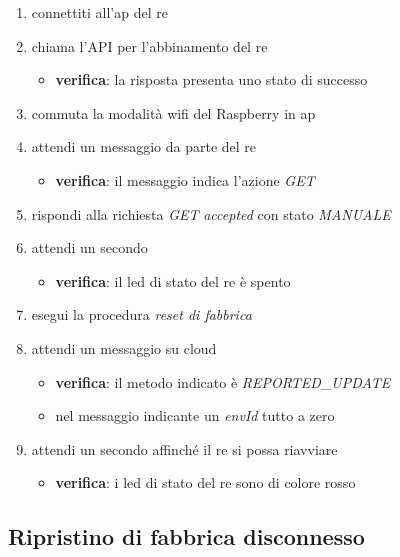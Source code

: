 \documentclass[12pt,a4paper,twoside,titlepage]{book}
\begin{document}
\begin{enumerate}
    \item connettiti all'\acrshort{ap} del \acrshort{re}
    \item chiama l'API per l'abbinamento del \acrshort{re} 
    \begin{itemize}
        \item \textbf{verifica}: la risposta presenta uno stato di successo 
    \end{itemize}
    \item commuta la modalità \Gls{wifi} del Raspberry in \acrshort{ap}
    \item attendi un messaggio da parte del \acrshort{re}
    \begin{itemize}
        \item \textbf{verifica}: il messaggio indica l'azione \textit{GET}
    \end{itemize}
    \item rispondi alla richiesta \textit{GET} \textit{accepted} con stato \textit{MANUALE}
    \item attendi un secondo 
    \begin{itemize}
        \item \textbf{verifica}: il \acrshort{led} di stato del \acrshort{re} è spento 
    \end{itemize}
    \item esegui la procedura \textit{reset di fabbrica}
    \item attendi un messaggio su cloud
    \begin{itemize}
        \item \textbf{verifica}: il metodo indicato è \textit{REPORTED\_UPDATE}
        \item nel messaggio indicante un \textit{envId} tutto a zero
    \end{itemize}
    \item attendi un secondo affinché il \acrshort{re} si possa riavviare
    \begin{itemize}
        \item \textbf{verifica}: i  \acrshort{led} di stato del \acrshort{re} sono di colore rosso
    \end{itemize}
\end{enumerate}

\subsection{Ripristino di fabbrica disconnesso}
\label{section:test_factory_reset_offline}
\end{document}

